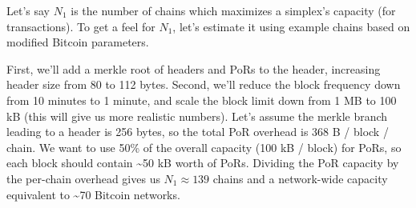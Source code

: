 Let's say $N_1$ is the number of chains which maximizes a simplex's capacity (for transactions).
To get a feel for $N_1$, let's estimate it using example chains based on modified Bitcoin parameters.

First, we'll add a merkle root of headers and PoRs to the header, increasing header size from 80 to 112 bytes.
Second, we'll reduce the block frequency down from 10 minutes to 1 minute, and scale the block limit down from 1 MB to 100 kB (this will give us more realistic numbers).
Let's assume the merkle branch leading to a header is 256 bytes, so the total PoR overhead is 368 B / block / chain.
We want to use 50\% of the overall capacity (100 kB / block) for PoRs, so each block should contain \sim 50 kB worth of PoRs.
Dividing the PoR capacity by the per-chain overhead gives us $N_1 \approx 139$ chains and a network-wide capacity equivalent to \sim 70 Bitcoin networks.
